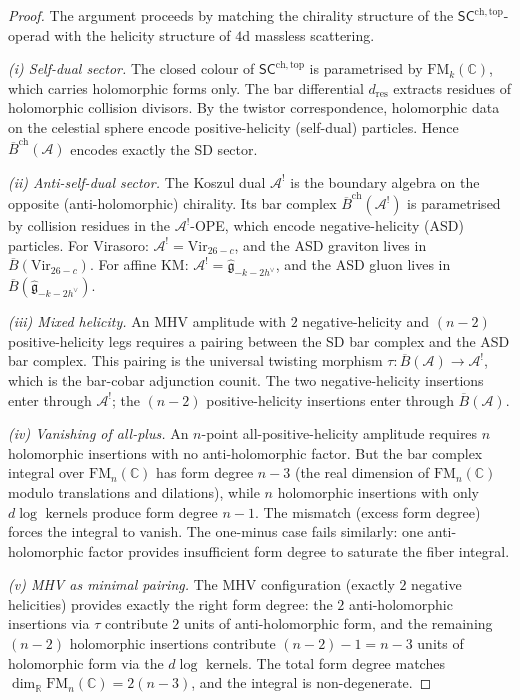 \documentclass[11pt]{article}
\newcommand{\cA}{\mathcal{A}}
\newcommand{\fg}{\mathfrak{g}}
\newcommand{\barB}{\overline{B}}
\newcommand{\C}{\mathbb{C}}
\newcommand{\R}{\mathbb{R}}
\newcommand{\SCchtop}{\mathsf{SC}^{\mathrm{ch,top}}}
\newcommand{\FM}{\mathrm{FM}}
\begin{document}
\begin{proof}
The argument proceeds by matching the chirality structure of the
$\SCchtop$-operad with the helicity structure of $4$d massless
scattering.

\emph{(i) Self-dual sector.}
The closed colour of $\SCchtop$ is parametrised by
$\FM_k(\C)$, which carries holomorphic forms only.  The bar
differential $d_{\mathrm{res}}$ extracts residues of
holomorphic collision divisors.  By the twistor correspondence,
holomorphic data on the celestial sphere encode
positive-helicity (self-dual) particles.  Hence
$\barB^{\mathrm{ch}}(\cA)$ encodes exactly the SD sector.

\emph{(ii) Anti-self-dual sector.}
The Koszul dual $\cA^!$ is the boundary algebra on the opposite
(anti-holomorphic) chirality.  Its bar complex
$\barB^{\mathrm{ch}}(\cA^!)$ is parametrised by collision
residues in the $\cA^!$-OPE, which encode negative-helicity
(ASD) particles.  For Virasoro:
$\cA^! = \mathrm{Vir}_{26-c}$, and the ASD graviton lives in
$\barB(\mathrm{Vir}_{26-c})$.  For affine KM:
$\cA^! = \widehat{\fg}_{-k-2h^\vee}$, and the ASD gluon lives
in $\barB(\widehat{\fg}_{-k-2h^\vee})$.

\emph{(iii) Mixed helicity.}
An MHV amplitude with $2$ negative-helicity and $(n-2)$
positive-helicity legs requires a pairing between the SD bar
complex and the ASD bar complex.  This pairing is the universal
twisting morphism $\tau \colon \barB(\cA) \to \cA^!$, which is
the bar-cobar adjunction counit.  The two negative-helicity
insertions enter through $\cA^!$; the $(n-2)$ positive-helicity
insertions enter through $\barB(\cA)$.

\emph{(iv) Vanishing of all-plus.}
An $n$-point all-positive-helicity amplitude requires
$n$ holomorphic insertions with no anti-holomorphic factor.  But
the bar complex integral over $\FM_n(\C)$ has form degree
$n - 3$ (the real dimension of $\FM_n(\C)$ modulo translations
and dilations), while $n$ holomorphic insertions with only
$d\log$ kernels produce form degree $n - 1$.  The mismatch
(excess form degree) forces the integral to vanish.  The
one-minus case fails similarly: one anti-holomorphic factor
provides insufficient form degree to saturate the fiber integral.

\emph{(v) MHV as minimal pairing.}
The MHV configuration (exactly $2$ negative helicities) provides
exactly the right form degree: the $2$ anti-holomorphic
insertions via $\tau$ contribute $2$ units of anti-holomorphic
form, and the remaining $(n-2)$ holomorphic insertions contribute
$(n-2) - 1 = n - 3$ units of holomorphic form via the $d\log$
kernels.  The total form degree matches $\dim_\R \FM_n(\C) = 2(n-3)$,
and the integral is non-degenerate.
\end{proof}
\end{document}
